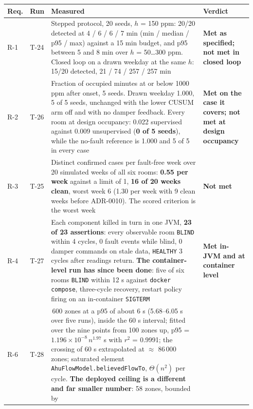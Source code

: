 \begin{longtable}[]{@{}
  >{\raggedright\arraybackslash}p{}
  >{\raggedright\arraybackslash}p{}
  >{\raggedright\arraybackslash}p{}
  >{\raggedright\arraybackslash}p{}@{}}
\toprule
\textbf{Req.} & \textbf{Run} & \textbf{Measured} & \textbf{Verdict} \\
\midrule
\endhead
R-1 & T-24 & Stepped protocol, 20 seeds, $h$ = 150 ppm: 20/20 detected at 4 / 6 / 6 / 7 min
(min / median / p95 / max) against a 15 min budget, and p95 between 5 and 8 min over
$h$ = 50…300 ppm. Closed loop on a drawn weekday at the same $h$: 15/20 detected, 21 / 74 / 257 /
257 min & \textbf{Met as specified; not met in closed loop} \\
R-2 & T-26 & Fraction of occupied minutes at or below 1000 ppm after onset, 5 seeds. Drawn weekday
1.000, 5 of 5 seeds, unchanged with the lower CUSUM arm off and with no damper feedback. Every room
at design occupancy: 0.022 supervised against 0.009 unsupervised (\textbf{0 of 5 seeds}),
while the no-fault reference is 1.000 and 5 of 5 in every case & \textbf{Met on the case it
covers; not met at design occupancy} \\
R-3 & T-25 & Distinct confirmed cases per fault-free week over 20 simulated weeks of all six rooms:
\textbf{0.55 per week} against a limit of 1, \textbf{16 of 20 weeks clean}, worst week 6 (1.30 per
week with 9 clean weeks before ADR-0010). The scored criterion is the worst week & \textbf{Not met} \\
R-4 & T-27 & Each component killed in turn in one JVM, \textbf{23 of 23 assertions}: every
observable room \texttt{BLIND} within 4 cycles, 0 fault events while blind, 0 damper commands on
stale data, \texttt{HEALTHY} 3 cycles after readings return. \textbf{The container-level run has
since been done}: five of six rooms \texttt{BLIND} within 12 s against \texttt{docker compose},
three-cycle recovery, restart policy firing on an in-container \texttt{SIGTERM} & \textbf{Met
in-JVM and at container level} \\
R-6 & T-28 & 25\,600 zones at a p95 of about 6 s (5.68–6.05 s over five runs), inside the 60 s
interval; fitted over the nine points from 100 zones up,
p95 = $1.196\times10^{-8}\,n^{1.97}$ s with $r^2$ = 0.9991; the crossing of 60 s extrapolated at
$\approx$ 86\,000 zones; saturated element \texttt{AhuFlowModel.believedFlowTo}, $\Theta(n^2)$ per
cycle. \textbf{The deployed ceiling is a different and far smaller number}: 58 zones, bounded by

\end{longtable}

